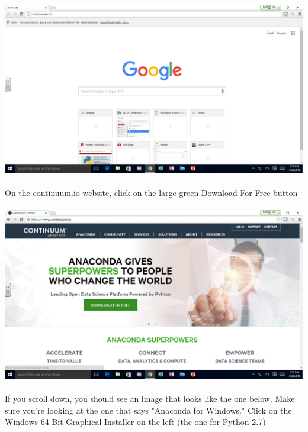 \documentclass[]{article}
\begin{document}
\paragraph{}
\begin{centering}
    \centerline{\includegraphics[scale=0.35]{Screenshot_1.png}}
\end{centering}

\paragraph{}
On the continuum.io website, click on the large green Download For Free button
\paragraph{}
\begin{centering}
    \centerline{\includegraphics[scale=0.35]{Screenshot_2.png}}
\end{centering}

\paragraph{}
If you scroll down, you should see an image that looks like the one below. Make sure you're looking at the one that says "Anaconda for Windows." Click on the Windows 64-Bit Graphical Installer on the left (the one for Python 2.7)
\end{document}
